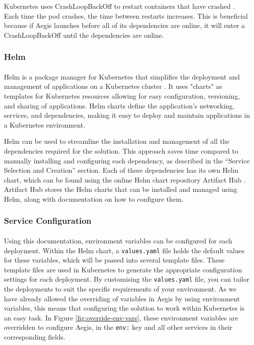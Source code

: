 \documentclass[12pt, conference, final, a4paper, onecolumn, compsoc]{IEEEtran}
\begin{document}
Kubernetes uses CrashLoopBackOff to restart containers that have crashed \citep{k8s-docs}. Each
time the pod crashes, the time between restarts increases. This is beneficial
because if Aegis launches before all of its dependencies are online, it will
enter a CrashLoopBackOff until the dependencies are online.

\subsubsection*{Helm}
\paragraph{}
Helm is a package manager for Kubernetes that simplifies the deployment and
management of applications on a Kubernetes cluster \citep{helm}. It uses
"charts" as templates for Kubernetes resources allowing for easy configuration,
versioning, and sharing of applications. Helm charts define the application's
networking, services, and dependencies, making it easy to deploy and maintain
applications in a Kubernetes environment.

Helm can be used to streamline the installation and management of all the
dependencies required for the solution. This approach saves time compared to
manually installing and configuring each dependency, as described in the
``Service Selection and Creation'' section. Each of these dependencies has its
own Helm chart, which can be found using the online Helm chart repository
Artifact Hub \citep{artifact-hub}. Artifact Hub stores the Helm charts that can
be installed and managed using Helm, along with documentation on how to
configure them.

\subsubsection*{Service Configuration}
\paragraph{}

Using this documentation, environment variables can be configured for each
deployment. Within the Helm chart, a \texttt{values.yaml} file holds the default
values for these variables, which will be passed into several template files.
These template files are used in Kubernetes to generate the appropriate
configuration settings for each deployment. By customising the
\texttt{values.yaml} file, you can tailor the deployments to suit the specific
requirements of your environment. As we have already allowed the overriding of
variables in Aegis by using environment variables, this means that configuring
the solution to work within Kubernetes is an easy task. In Figure
\ref{fig:override-env-vars}, these environment variables are overridden to
configure Aegis, in the \texttt{env:} key and all other services in their
corresponding fields.
\end{document}
